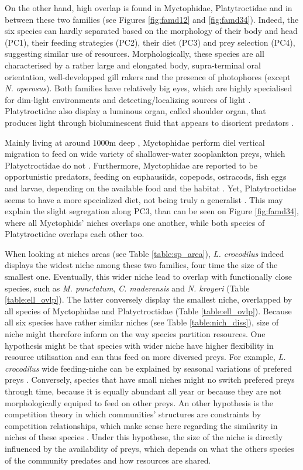 On the other hand, high overlap is found in Myctophidae, Platytroctidae and in between these two families (see Figures \ref{fig:famd12} and \ref{fig:famd34}). Indeed, the six species can hardly separated based on the morphology of their body and head (PC1), their feeding strategies (PC2), their diet (PC3) and prey selection (PC4), suggesting similar use of resources. Morphologically, these species are all characterised by a rather large and elongated body, supra-terminal oral orientation, well-developped gill rakers and the presence of photophores (except \textit{N. operosus}). Both families have relatively big eyes, which are highly specialised for dim-light environments and detecting/localizing sources of light \citep{debusserolles2014,novotny2018}. Platytroctidae also display a luminous organ, called shoulder organ, that produces light through bioluminescent fluid that appears to disorient predators \citep{novotny2018}. 

Mainly living at around 1000m deep \citep{froese2019}, Myctophidae perform diel vertical migration to feed on wide variety of shallower-water zooplankton preys, which Platyctroctidae do not \citep{sutton2013a}. Furthermore, Myctophidae are reported to be opportunistic predators, feeding on euphausiids, copepods, ostracods, fish eggs and larvae, depending on the available food and the habitat \citet{catul2011,kozlov1995}. Yet, Platytroctidae seems to have a more specialized diet, not being truly a generalist \citet{novotny2018}. This may explain the slight segregation along PC3, than can be seen on Figure \ref{fig:famd34}, where all Myctophids' niches overlaps one another, while both species of Platytroctidae overlaps each other too. 

When looking at niches areas (see Table \ref{table:sp_area}), \textit{L. crocodilus} indeed displays the widest niche among these two families, four time the size of the smallest one. Eventually, this wider niche lead to overlap with functionally close species, such as \textit{M. punctatum}, \textit{C. maderensis} and \textit{N. kroyeri} (Table \ref{table:ell_ovlp}). The latter conversely display the smallest niche, overlapped by all species of Myctophidae and Platyctroctidae (Table \ref{table:ell_ovlp}). Because all six species have rather similar niches (see Table \ref{table:nich_diss}), size of niche might therefore inform on the way species partition resources. One hypothesis might be that species with wider niche have higher flexibility in resource utilisation and can thus feed on more diversed preys. For example, \textit{L. crocodilus} wide feeding-niche can be explained by seasonal variations of prefered preys \citet{fanelli2014}. Conversely, species that have small niches might no switch prefered preys through time, because it is equally abundant all year or because they are not morphologically equiped to feed on other preys. An other hypothesis is the competition theory in which communities' structures are constraints by competition relationships, which make sense here regarding the similarity in niches of these species \citep{geange2011}. Under this hypothese, the size of the niche is directly influenced by the availability of preys, which depends on what the others species of the community predates and how resources are shared.


